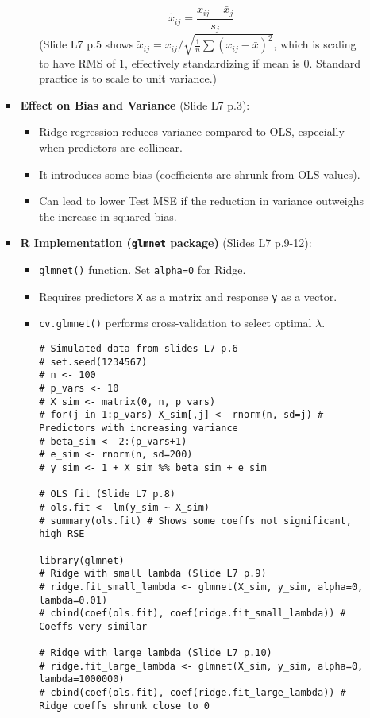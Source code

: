 \documentclass[12pt,a4paper]{article}
\newcommand{\Rpackage}[1]{\texttt{#1}} %
\newcommand{\Rfunction}[1]{\texttt{#1()}} %
\newcommand{\Robject}[1]{\texttt{#1}} %
\newcommand{\Rcode}[1]{\texttt{#1}} %
\begin{document}
\begin{itemize}
\begin{itemize}
\begin{itemize}
\begin{itemize}
                        $$ \tilde{x}_{ij} = \frac{x_{ij} - \bar{x}_j}{s_j} $$
                        (Slide L7 p.5 shows $\tilde{x}_{ij} = x_{ij} / \sqrt{\frac{1}{n}\sum(x_{ij}-\bar{x})^2}$, which is scaling to have RMS of 1, effectively standardizing if mean is 0. Standard practice is to scale to unit variance.)
                \end{itemize}
            \item \textbf{Effect on Bias and Variance} (Slide L7 p.3):
                \begin{itemize}
                    \item Ridge regression reduces variance compared to OLS, especially when predictors are collinear.
                    \item It introduces some bias (coefficients are shrunk from OLS values).
                    \item Can lead to lower Test MSE if the reduction in variance outweighs the increase in squared bias.
                \end{itemize}
            \item \textbf{R Implementation (\Rpackage{glmnet} package)} (Slides L7 p.9-12):
                \begin{itemize}
                    \item \Rfunction{glmnet} function. Set \Rcode{alpha=0} for Ridge.
                    \item Requires predictors \Robject{X} as a matrix and response \Robject{y} as a vector.
                    \item \Rfunction{cv.glmnet} performs cross-validation to select optimal $\lambda$.
\begin{lstlisting}[caption={Ridge Regression Example (Simulated Data, Slides L7 p.6-12)}]
# Simulated data from slides L7 p.6
# set.seed(1234567)
# n <- 100
# p_vars <- 10
# X_sim <- matrix(0, n, p_vars)
# for(j in 1:p_vars) X_sim[,j] <- rnorm(n, sd=j) # Predictors with increasing variance
# beta_sim <- 2:(p_vars+1)
# e_sim <- rnorm(n, sd=200)
# y_sim <- 1 + X_sim %% beta_sim + e_sim

# OLS fit (Slide L7 p.8)
# ols.fit <- lm(y_sim ~ X_sim)
# summary(ols.fit) # Shows some coeffs not significant, high RSE

library(glmnet)
# Ridge with small lambda (Slide L7 p.9)
# ridge.fit_small_lambda <- glmnet(X_sim, y_sim, alpha=0, lambda=0.01)
# cbind(coef(ols.fit), coef(ridge.fit_small_lambda)) # Coeffs very similar

# Ridge with large lambda (Slide L7 p.10)
# ridge.fit_large_lambda <- glmnet(X_sim, y_sim, alpha=0, lambda=1000000)
# cbind(coef(ols.fit), coef(ridge.fit_large_lambda)) # Ridge coeffs shrunk close to 0


\end{lstlisting}
\end{itemize}
\end{itemize}
\end{itemize}
\end{itemize}
\end{document}
